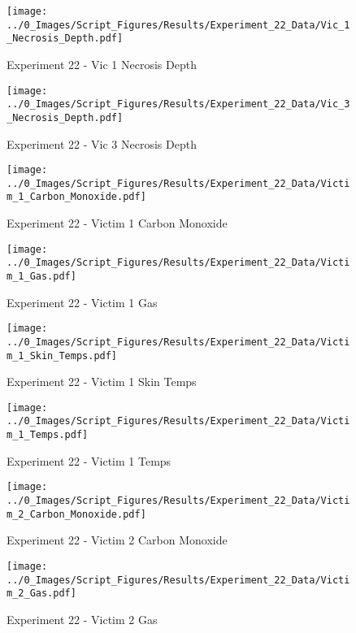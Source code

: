 	\begin{figure}[H]
		\centering
		\texttt{[image: ../0\_Images/Script\_Figures/Results/Experiment\_22\_Data/Vic\_1\_Necrosis\_Depth.pdf]}
		\caption[]{Experiment 22 - Vic 1 Necrosis Depth}
	\end{figure}
 
	\clearpage

	\begin{figure}[H]
		\centering
		\texttt{[image: ../0\_Images/Script\_Figures/Results/Experiment\_22\_Data/Vic\_3\_Necrosis\_Depth.pdf]}
		\caption[]{Experiment 22 - Vic 3 Necrosis Depth}
	\end{figure}
 

	\begin{figure}[H]
		\centering
		\texttt{[image: ../0\_Images/Script\_Figures/Results/Experiment\_22\_Data/Victim\_1\_Carbon\_Monoxide.pdf]}
		\caption[]{Experiment 22 - Victim 1 Carbon Monoxide}
	\end{figure}
 
	\clearpage

	\begin{figure}[H]
		\centering
		\texttt{[image: ../0\_Images/Script\_Figures/Results/Experiment\_22\_Data/Victim\_1\_Gas.pdf]}
		\caption[]{Experiment 22 - Victim 1 Gas}
	\end{figure}
 

	\begin{figure}[H]
		\centering
		\texttt{[image: ../0\_Images/Script\_Figures/Results/Experiment\_22\_Data/Victim\_1\_Skin\_Temps.pdf]}
		\caption[]{Experiment 22 - Victim 1 Skin Temps}
	\end{figure}
 
	\clearpage

	\begin{figure}[H]
		\centering
		\texttt{[image: ../0\_Images/Script\_Figures/Results/Experiment\_22\_Data/Victim\_1\_Temps.pdf]}
		\caption[]{Experiment 22 - Victim 1 Temps}
	\end{figure}
 

	\begin{figure}[H]
		\centering
		\texttt{[image: ../0\_Images/Script\_Figures/Results/Experiment\_22\_Data/Victim\_2\_Carbon\_Monoxide.pdf]}
		\caption[]{Experiment 22 - Victim 2 Carbon Monoxide}
	\end{figure}
 
	\clearpage

	\begin{figure}[H]
		\centering
		\texttt{[image: ../0\_Images/Script\_Figures/Results/Experiment\_22\_Data/Victim\_2\_Gas.pdf]}
		\caption[]{Experiment 22 - Victim 2 Gas}
	\end{figure}
 

